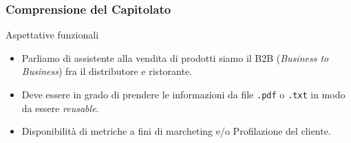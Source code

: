 \documentclass{beamer}
\begin{document}




\begin{frame}
    \frametitle{Comprensione del Capitolato}
        \begin{block}{Aspettative funzionali}
            \begin{itemize}
                \item Parliamo di assistente alla vendita di prodotti siamo il B2B (\textit{Business to Business}) fra il distributore e ristorante.
                \item Deve essere in grado di prendere le informazioni da file \texttt{.pdf} o \texttt{.txt} in modo da essere \textit{reusable}.
                \item Disponibilità di metriche a fini di marcheting e/o Profilazione del cliente.
            \end{itemize}
        \end{block}
\end{frame}
\end{document}
